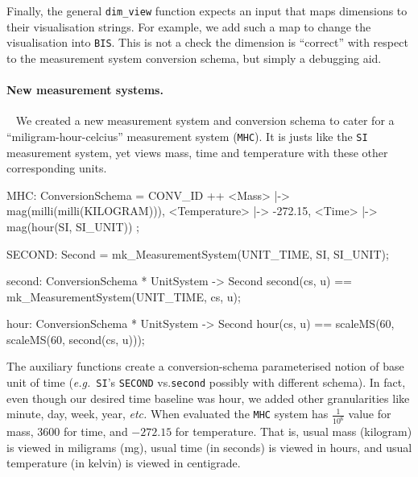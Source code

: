 \documentclass[runningheads,a4paper]{llncs}
\begin{document}
Finally, the general \texttt{dim\_view} function expects an input that maps dimensions to their visualisation strings. For example, we add such a map to change the visualisation into \texttt{BIS}. This is not a check the dimension is ``correct'' with respect to the measurement system conversion schema, but simply a debugging aid.     

\paragraph*{New measurement systems.}~
%
We created a new measurement system and conversion schema to cater for a ``miligram-hour-celcius'' measurement system (\texttt{MHC}). It is justs like the \texttt{SI} measurement system, yet views mass, time and temperature with these other corresponding units.
%
\begin{vdmsl}[frame=none,basicstyle=\ttfamily\scriptsize]
    MHC: ConversionSchema = CONV_ID ++ 
        { <Mass> |-> mag(milli(milli(KILOGRAM))), <Temperature> |-> -272.15,
          <Time> |-> mag(hour(SI, SI_UNIT)) };

    SECOND: Second = mk_MeasurementSystem(UNIT_TIME, SI, SI_UNIT);

    second: ConversionSchema * UnitSystem -> Second
    second(cs, u) == mk_MeasurementSystem(UNIT_TIME, cs, u);
    
    hour: ConversionSchema * UnitSystem -> Second 
    hour(cs, u) == scaleMS(60, scaleMS(60, second(cs, u)));      
\end{vdmsl}
%
\noindent The auxiliary functions create a conversion-schema parameterised notion of base unit of time (\textit{e.g.}~\texttt{SI}'s \texttt{SECOND} vs.\@ \texttt{second} possibly with different schema). In fact, even though our desired time baseline was hour, we added other granularities like minute, day, week, year, \textit{etc.} When evaluated the \texttt{MHC} system has \(\frac{1}{10^6}\) value for mass, \(3600\) for time, and \(-272.15\) for temperature. That is, usual mass (kilogram) is viewed in miligrams (mg), usual time (in seconds) is viewed in hours, and usual temperature (in kelvin) is viewed in centigrade.
\end{document}
